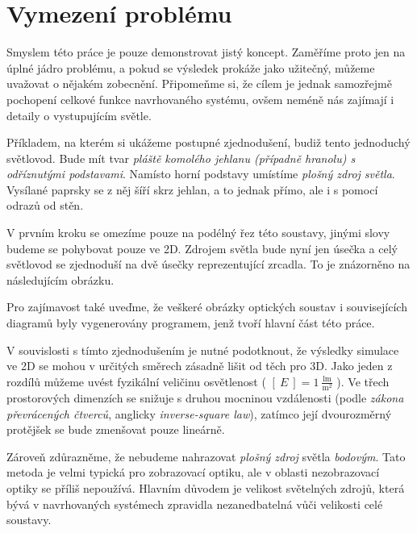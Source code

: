 \section{Vymezení problému}
\label{sec:vymezeniproblemu}

Smyslem této práce je pouze demonstrovat jistý koncept. Zaměříme proto jen na úplné jádro problému, a pokud se výsledek prokáže jako užitečný, můžeme uvažovat o nějakém zobecnění. Připomeňme si, že cílem je jednak samozřejmě pochopení celkové funkce navrhovaného systému, ovšem neméně nás zajímají i detaily o vystupujícím světle.

Příkladem, na kterém si ukážeme postupné zjednodušení, budiž tento jednoduchý světlovod. Bude mít tvar \emph{pláště komolého jehlanu (případně hranolu) s odříznutými podstavami}. Namísto horní podstavy umístíme \emph{plošný zdroj světla}. Vysílané paprsky se z něj šíří skrz jehlan, a to jednak přímo, ale i s pomocí odrazů od stěn.

V prvním kroku se omezíme pouze na podélný řez této soustavy, jinými slovy budeme se pohybovat pouze ve 2D. Zdrojem světla bude nyní jen úsečka a celý světlovod se zjednoduší na dvě úsečky reprezentující zrcadla. To je znázorněno na následujícím obrázku.

Pro zajímavost také uveďme, že veškeré obrázky optických soustav i souvisejících diagramů byly vygenerovány programem, jenž tvoří hlavní část této práce. 


V souvislosti s tímto zjednodušením je nutné podotknout, že výsledky simulace ve 2D se mohou v určitých směrech zásadně lišit od těch pro 3D. Jako jeden z rozdílů můžeme uvést fyzikální veličinu osvětlenost ( $ [\ E\ ] = 1 \ \mathrm{\frac{lm}{m^2}} $ ). Ve třech prostorových dimenzích se snižuje s druhou mocninou vzdálenosti (podle \emph{zákona převrácených čtverců}, anglicky \emph{inverse-square law}), zatímco její dvourozměrný protějšek se bude zmenšovat pouze lineárně.

Zároveň zdůrazněme, že nebudeme nahrazovat \emph{plošný zdroj} světla \emph{bodovým}. Tato metoda je velmi typická pro zobrazovací optiku, ale v oblasti nezobrazovací optiky se příliš nepoužívá. Hlavním důvodem je velikost světelných zdrojů, která bývá v navrhovaných systémech zpravidla nezanedbatelná vůči velikosti celé soustavy.


